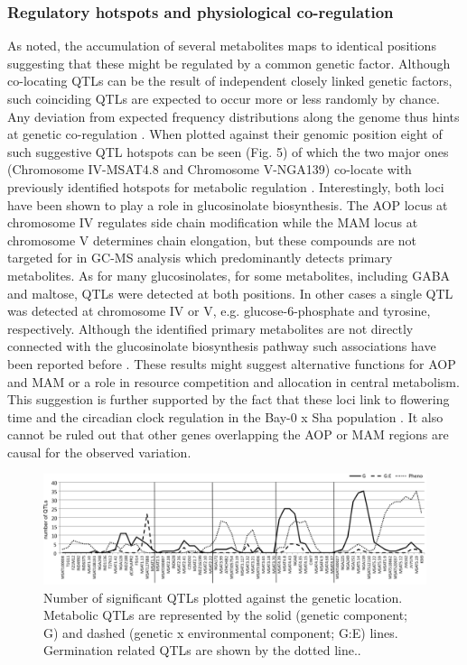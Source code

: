 \subsubsection{Regulatory hotspots and physiological co-regulation}
As noted, the accumulation of several metabolites maps to identical positions suggesting that these might 
be regulated by a common genetic factor. Although co-locating QTLs can be the result of independent closely 
linked genetic factors, such coinciding QTLs are expected to occur more or less randomly by chance. Any 
deviation from expected frequency distributions along the genome thus hints at genetic co-regulation 
\cite{Breitling:2008a}. When plotted against their genomic position eight of such suggestive QTL hotspots 
can be seen (Fig. 5) of which the two major ones (Chromosome IV-MSAT4.8 and Chromosome V-NGA139) co-locate 
with previously identified hotspots for metabolic regulation \cite{Kliebenstein:2001, Keurentjes:2006, 
Wentzell:2007, Rowe:2008}.  Interestingly, both loci have been shown to play a role in glucosinolate 
biosynthesis. The AOP locus at chromosome IV regulates side chain modification while the 
MAM locus at chromosome V determines chain elongation, but these compounds are not targeted for in GC-MS 
analysis which predominantly detects primary metabolites. As for many glucosinolates, for some metabolites, 
including GABA and maltose, QTLs were detected at both positions. In other cases a single QTL was detected 
at chromosome IV or V, e.g. glucose-6-phosphate and tyrosine, respectively. Although the identified  primary 
metabolites are not directly connected with the glucosinolate biosynthesis pathway such associations have 
been reported before \cite{Rowe:2008}. These results might suggest alternative functions for AOP and MAM 
or a role in resource competition and allocation in central metabolism. This suggestion is further supported 
by the fact that these loci link to flowering time and the circadian clock regulation in the Bay-0 x Sha 
population \cite{Chan:2011}. It also cannot be ruled out that other genes overlapping the AOP or MAM 
regions are causal for the observed variation.

\begin{figure}[h!]
  \centering
  \includegraphics[keepaspectratio,scale=0.30]{eps/image_3_2_5.eps}
  \caption[Number of significant QTL]{Number of significant QTLs plotted against the genetic location. Metabolic 
          QTLs are represented by the solid (genetic component; G) and dashed (genetic x environmental component; 
          G:E) lines. Germination related QTLs \cite{Joosen:2012} are shown by the dotted line..}
\end{figure}

